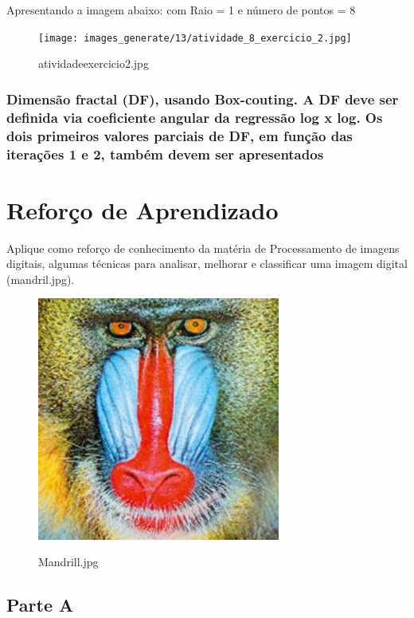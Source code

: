 \documentclass[10pt,a4paper]{article}
\begin{document}
\begin{flushleft}
Apresentando a imagem abaixo: com Raio = 1 e número de pontos = 8 
\end{flushleft}

\begin{figure}[H]
    \centering
    {{\texttt{[image: images\_generate/13/atividade\_8\_exercicio\_2.jpg]}}}
    \caption{atividade\textunderscore exercicio\textunderscore 2.jpg}
\end{figure}

\subsubsection{Dimensão fractal (DF), usando Box-couting. A DF deve ser definida via coeficiente angular da regressão log x log. Os dois primeiros valores parciais de DF, em função das iterações 1 e 2, também devem ser apresentados}

\section{Reforço de Aprendizado}

Aplique como reforço de conhecimento da matéria de Processamento de imagens digitais, algumas técnicas para analisar, melhorar e classificar uma imagem digital (mandril.jpg).

\begin{figure}[H]
    \centering
    {{\includegraphics[width=8cm]{images_original/14/Mandrill.jpg}}}
    \caption{Mandrill.jpg}
\end{figure}

\subsection{Parte A}
\end{document}
